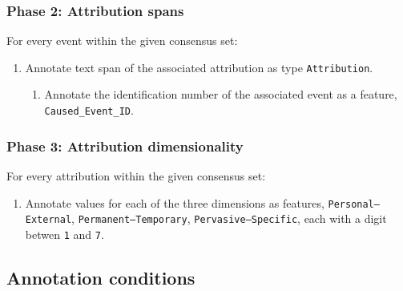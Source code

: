 \documentclass[a4paper,12pt]{article}
\begin{document}
    \subsubsection{Phase 2: Attribution spans}
    For every event within the given consensus set:
        \begin{enumerate}
            \item Annotate text span of the associated attribution as type \texttt{Attribution}.
                \begin{enumerate}
                    \item Annotate the identification number of the associated event as a feature, \texttt{Caused\_Event\_ID}.
                \end{enumerate}
        \end{enumerate}
    \subsubsection{Phase 3: Attribution dimensionality}
    For every attribution within the given consensus set:
        \begin{enumerate}
            \item Annotate values for each of the three dimensions as features, \texttt{Personal--External}, \texttt{Permanent--Temporary}, \texttt{Pervasive--Specific}, each with a digit betwen \texttt{1} and \texttt{7}.
        \end{enumerate}

    \newpage
    \subsection{Annotation conditions}
\end{document}
